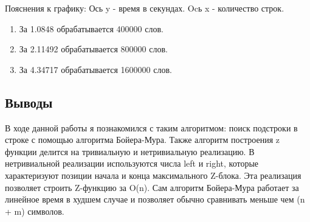 \documentclass[12pt]{article}
\begin{document}
\newline
Пояснения к графику:
Ось y - время в секундах. Ocь x - количество строк.
\begin{enumerate}
\item За 1.0848 обрабатывается 400000 слов.
\item За 2.11492 обрабатывается 800000 слов.
\item За 4.34717 обрабатывается 1600000 слов.
\end{enumerate}
\newline 

\subsection*{Выводы}

В ходе данной работы я познакомился с таким алгоритмом: поиск подстроки в строке с помощью алгоритма Бойера-Мура. Также алгоритм построения z функции делится на тривиальную и нетривиальную реализацию. В нетривиальной реализации используются числа left и right, которые характеризуют позиции начала и конца максимального Z-блока. Эта реализация позволяет строить Z-функцию за O(n). Сам алгоритм Бойера-Мура работает за линейное время в худшем случае и позволяет обычно сравнивать меньше  чем (n + m) символов.
\end{document}
